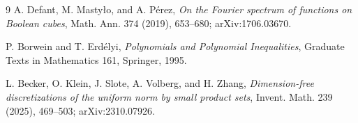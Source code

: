 \documentclass[11pt]{article}
\begin{document}
\begin{thebibliography}{9}
A. Defant, M. Masty\l o, and A. P\'erez,
\emph{On the Fourier spectrum of functions on Boolean cubes},
Math. Ann. 374 (2019), 653--680; arXiv:1706.03670.

P. Borwein and T. Erd\'elyi,
\emph{Polynomials and Polynomial Inequalities},
Graduate Texts in Mathematics 161, Springer, 1995.

L. Becker, O. Klein, J. Slote, A. Volberg, and H. Zhang,
\emph{Dimension-free discretizations of the uniform norm by small product sets},
Invent. Math. 239 (2025), 469--503; arXiv:2310.07926.
\end{thebibliography}
\end{document}
